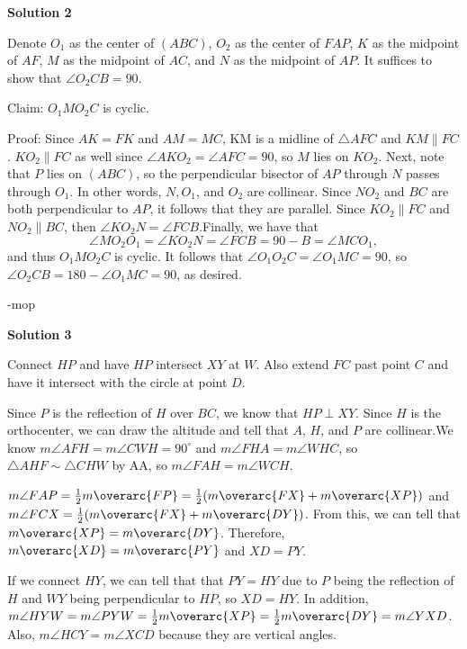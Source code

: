 \begin{enumerate}
 



\textbf{Solution 2}

Denote $O_1$ as the center of $(ABC)$, $O_2$ as the center of $FAP$, $K$ as the midpoint of $AF$, $M$ as the midpoint of $AC$, and $N$ as the midpoint of $AP$. It suffices to show that $\angle{O_2CB}=90$.

 Claim: $O_1MO_2C$ is cyclic. 

 Proof: Since $AK=FK$ and $AM=MC$, KM is a midline of $\triangle{AFC}$ and $KM\parallel FC$. $KO_2\parallel FC$ as well since $\angle{AKO_2}=\angle{AFC}=90$, so $M$ lies on $KO_2$. Next, note that $P$ lies on $(ABC)$, so the perpendicular bisector of $AP$ through $N$ passes through $O_1$. In other words, $N, O_1$, and $O_2$ are collinear. Since $NO_2$ and $BC$ are both perpendicular to $AP$, it follows that they are parallel. Since $KO_2\parallel FC$ and $NO_2\parallel BC$, then $\angle KO_2N=\angle{FCB}$.Finally, we have that 
 \[\angle{MO_2O_1}=\angle{KO_2N}=\angle{FCB}=90-B=\angle{MCO_1},\]and thus $O_1MO_2C$ is cyclic. It follows that $\angle O_1O_2C=\angle{O_1MC}=90$, so $\angle{O_2CB}=180-\angle{O_1MC}=90$, as desired.

 -mop

 



\textbf{Solution 3}

Connect $HP$ and have $HP$ intersect $XY$ at $W$. Also extend $FC$ past point $C$ and have it intersect with the circle at point $D$.

 Since $P$ is the reflection of $H$ over $BC$, we know that $HP\perp XY$. Since $H$ is the orthocenter, we can draw the altitude and tell that $A$, $H$, and $P$ are collinear.We know $m\angle{AFH} = m\angle{CWH}=90^{\circ}$ and $m\angle{FHA} = m\angle{WHC}$, so $\triangle{AHF} \sim \triangle{CHW}$ by AA, so $m\angle{FAH} = m\angle{WCH}$.

 $m\angle{FAP} = \frac{1}{2}m\overarc{FP} = \frac{1}{2}(m\overarc{FX} + m\overarc{XP})$ and $m\angle{FCX} = \frac{1}{2}(m\overarc{FX} + m\overarc{DY})$. From this, we can tell that $m\overarc{XP} = m\overarc{DY}$. Therefore, $m\overarc{XD} = m\overarc{PY}$ and $XD = PY$.

 If we connect $HY$, we can tell that that $PY = HY$ due to $P$ being the reflection of $H$ and $WY$ being perpendicular to $HP$, so $XD = HY$. In addition, $m\angle{HYW} = m\angle{PYW} = \frac{1}{2} m\overarc{XP} = \frac{1}{2} m\overarc{DY} = m\angle{YXD}$. Also, $m\angle{HCY} = m\angle{XCD}$ because they are vertical angles.


\end{enumerate}
